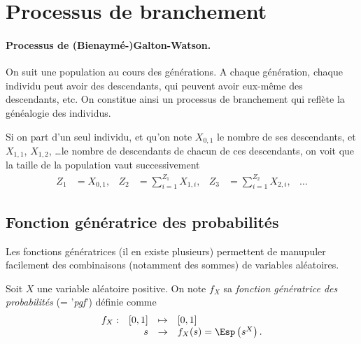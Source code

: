 \section{Processus de branchement} \label{sec:Proba-Branchement}

\paragraph*{Processus de (Bienaymé-)Galton-Watson.}
On suit une population au cours des générations. A chaque génération, chaque individu peut avoir des descendants, qui peuvent avoir eux-même des descendants, etc. On constitue ainsi un processus de branchement qui reflète la généalogie des individus.

Si on part d'un seul individu, et qu'on note $X_{0, 1}$ le nombre de ses descendants, et $X_{1, 1}$, $X_{1, 2}$, \dots le nombre de descendants de chacun de ces descendants, on voit que la taille de la population vaut successivement
\begin{align*}
  Z_1 & = X_{0, 1}, &
  Z_2 & = \sum_{i=1}^{Z_1} X_{1, i}, &
  Z_3 & = \sum_{i=1}^{Z_2} X_{2, i}, &
  \dots
\end{align*}

\subsection{Fonction génératrice des probabilités} 

Les fonctions génératrices (il en existe plusieurs) permettent de manupuler facilement des combinaisons (notamment des sommes) de variables aléatoires.

\begin{definition}
  Soit $X$ une variable aléatoire positive. On note $f_X$ sa {\em fonction génératrice des probabilités} (= '{\em pgf}') définie comme
  $$
  \begin{array}{rrcl}
    f_X : & [0, 1] & \mapsto & [0, 1] \\
      & s & \to & f_X(s) = \Esp\left(s^X\right).
  \end{array}
  $$
\end{definition}

